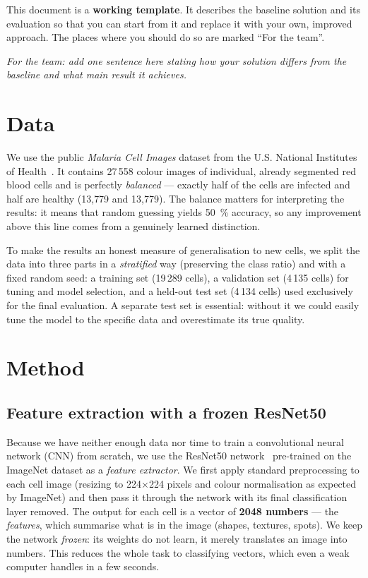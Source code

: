 \documentclass[11pt]{article}
\newcommand{\Ntotal}{27\,558}
\newcommand{\Ntrain}{19\,289}
\newcommand{\Nval}{4\,135}
\newcommand{\Ntest}{4\,134}
\begin{document}
This document is a \textbf{working template}. It describes the baseline solution and its
evaluation so that you can start from it and replace it with your own, improved approach. The
places where you should do so are marked ``For the team''.

\medskip\noindent\textit{For the team: add one sentence here stating how your solution differs
from the baseline and what main result it achieves.}

\section{Data}
\label{sec:data}

We use the public \emph{Malaria Cell Images} dataset from the U.S. National Institutes of
Health~\cite{rajaraman2018}. It contains \Ntotal{} colour images of individual, already
segmented red blood cells and is perfectly \emph{balanced} --- exactly half of the cells are
infected and half are healthy (13{,}779 and 13{,}779). The balance matters for interpreting the
results: it means that random guessing yields 50~\% accuracy, so any improvement above this line
comes from a genuinely learned distinction.

To make the results an honest measure of generalisation to new cells, we split the data into
three parts in a \emph{stratified} way (preserving the class ratio) and with a fixed random
seed: a training set (\Ntrain{} cells), a validation set (\Nval{} cells) for tuning and model
selection, and a held-out test set (\Ntest{} cells) used exclusively for the final evaluation.
A separate test set is essential: without it we could easily tune the model to the specific data
and overestimate its true quality.

\section{Method}
\label{sec:method}

\subsection{Feature extraction with a frozen ResNet50}
\label{sec:features}

Because we have neither enough data nor time to train a convolutional neural network (CNN) from
scratch, we use the ResNet50 network~\cite{he2016} pre-trained on the ImageNet dataset as a
\emph{feature extractor}. We first apply standard preprocessing to each cell image (resizing to
224$\times$224 pixels and colour normalisation as expected by ImageNet) and then pass it through
the network with its final classification layer removed. The output for each cell is a vector of
\textbf{2048 numbers} --- the \emph{features}, which summarise what is in the image (shapes,
textures, spots). We keep the network \emph{frozen}: its weights do not learn, it merely
translates an image into numbers. This reduces the whole task to classifying vectors, which even
a weak computer handles in a few seconds.
\end{document}
